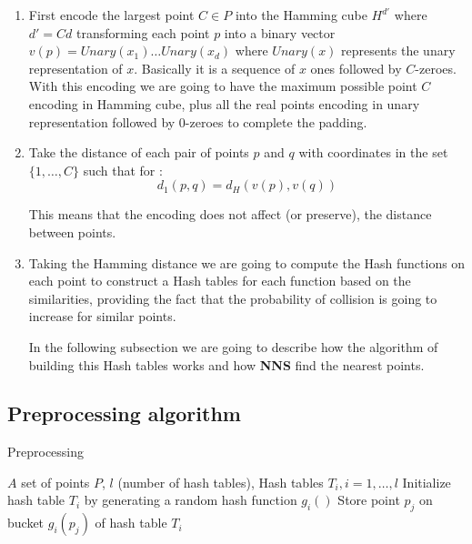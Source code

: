 \documentclass[12pt, a4paper]{article}
\theoremstyle{definition}
\begin{document}
\begin{enumerate}
  \item First encode the largest point $C \in P$ into the Hamming cube $H^{d'}$ where $d' = Cd$ transforming each point $p$ into a binary vector $v(p) = Unary(x_1) \dots Unary(x_d)$ where $Unary(x)$ represents the unary representation of $x$. Basically it is a sequence of $x$ ones followed by $C$-zeroes.
    With this encoding we are going to have the maximum possible point $C$ encoding in Hamming cube, plus all the real points encoding in unary representation followed by $0$-zeroes to complete the padding.
  \item Take the distance of each pair of points $p$ and $q$ with coordinates in the set $\{1,\dots, C\}$ such that for :
    \begin{equation*}
      d_1(p,q) = d_H(v(p), v(q))
    \end{equation*}

    This means that the encoding does not affect (or preserve), the distance between points.
  \item Taking the Hamming distance we are going to compute the Hash functions on each point to construct a Hash tables for each function based on the similarities, providing the fact that the probability of collision is going to increase for similar points.

In the following subsection we are going to describe how the algorithm of building this Hash tables works and how \textbf{NNS} find the nearest points.
\end{enumerate}

\subsection{Preprocessing algorithm}

    \begin{algorithm}[H]
     \label{alg:preproc}
     \caption{Preprocessing}
     \begin{algorithmic}
     \REQUIRE $A$ set of points $P$,
     \STATE $l$ (number of hash tables),
     \ENSURE Hash tables $T_i, i = 1, \dots ,l$
      \STATE Initialize hash table $T_i$ by generating
      a random hash function $g_i()$
     \ENDFOR
         \STATE Store point $p_j$ on bucket $g_i(p_j)$ of hash table $T_i$
       \ENDFOR
     \ENDFOR
   \end{algorithmic}
   \end{algorithm}
\end{document}
